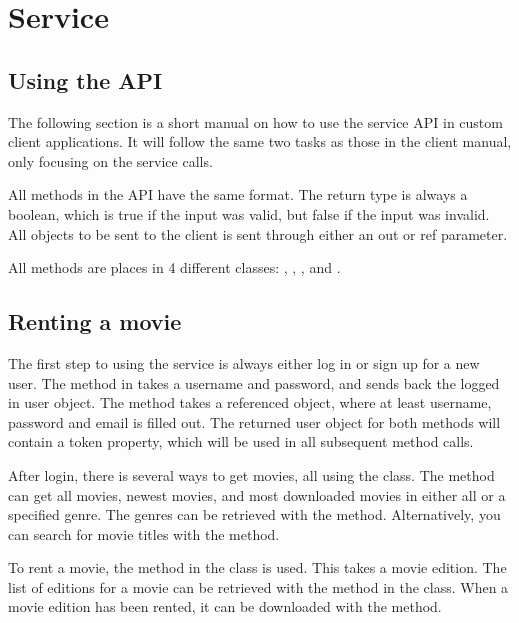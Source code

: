 \section{Service}
\label{Manual_Service}

\subsection{Using the API}
\label{Manual_Service_Usage}
The following section is a short manual on how to use the service API in custom client applications. It will follow the same two tasks as those in the client manual, only focusing on the service calls.

All methods in the API have the same format. The return type is always a boolean, which is true if the input was valid, but false if the input was invalid. All objects to be sent to the client is sent through either an out or ref parameter.

All methods are places in 4 different classes: , , , and .

\subsection{Renting a movie}
\label{Manual_Service_Usage_Rent}
The first step to using the service is always either log in or sign up for a new user. The  method in  takes a username and password, and sends back the logged in user object. The  method takes a referenced  object, where at least username, password and email is filled out. The returned user object for both methods will contain a token property, which will be used in all subsequent method calls.

After login, there is several ways to get movies, all using the  class. The  method can get all movies, newest movies, and most downloaded movies in either all or a specified genre. The genres can be retrieved with the  method. Alternatively, you can search for movie titles with the  method.

To rent a movie, the  method in the  class is used. This takes a movie edition. The list of editions for a movie can be retrieved with the  method in the  class. When a movie edition has been rented, it can be downloaded with the  method.


